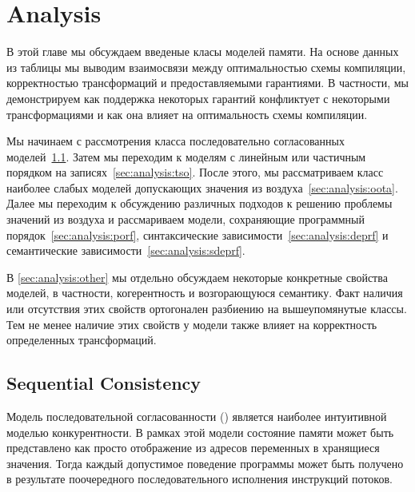 \section{Analysis}
\label{sec:analysis}


В этой главе мы обсуждаем введеные класы моделей памяти.
На основе данных из таблицы 
мы выводим взаимосвязи между оптимальностью схемы компиляции,
корректностью трансформаций и предоставляемыми гарантиями. 
В частности, мы демонстрируем как поддержка 
некоторых гарантий конфликтует с некоторыми трансформациями 
и как она влияет на оптимальность схемы компиляции. 

Мы начинаем с рассмотрения класса 
последовательно согласованных моделей~\cref{sec:analysis:seqcst}.
Затем мы переходим к моделям с линейным или 
частичным порядком на записях~\cref{sec:analysis:tso}.
После этого, мы рассматриваем класс наиболее слабых моделей 
допускающих значения из воздуха~\cref{sec:analysis:oota}.
Далее мы переходим к обсуждению различных подходов 
к решению проблемы значений из воздуха и рассмариваем модели, 
сохраняющие программный порядок~\cref{sec:analysis:porf},
синтаксические зависимости~\cref{sec:analysis:deprf} и
семантические зависимости~\cref{sec:analysis:sdeprf}.
 
В \cref{sec:analysis:other} мы отдельно обсуждаем некоторые 
конкретные свойства моделей, в частности, когерентность и возгорающуюся семантику. 
Факт наличия или отсутствия этих свойств ортогонален
разбиению на вышеупомянутые классы. 
Тем не менее наличие этих свойств у модели также влияет 
на корректность определенных трансформаций.

\subsection{Sequential Consistency}
\label{sec:analysis:seqcst}

Модель последовательной согласованности (\SC)
является наиболее интуитивной моделью конкурентности.
В рамках этой модели состояние памяти может быть 
представлено как просто отображение из 
адресов переменных в хранящиеся значения. 
Тогда каждый допустимое поведение программы 
может быть получено в результате поочередного последовательного
исполнения инструкций потоков. 

